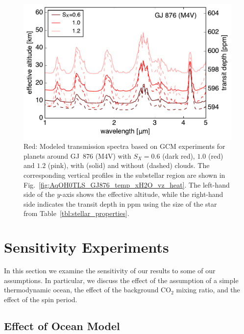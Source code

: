 \documentclass[11pt,numberedappendix,twocolappendix,]{emulateapj}
\newcommand{\yf}[1]{{\color{orange}#1}}
\begin{document}
\begin{figure}[!h]
    \begin{center}
    \includegraphics[width=\hsize]{fig/transit_GJ876.pdf}
    \end{center}
\caption{Red: Modeled transmission spectra based on GCM experiments for planets around GJ~876 (M4V) with $S_X=0.6$ (dark red), $1.0$ (red) and $1.2$ (pink), with (solid) and without (dashed) clouds. The corresponding vertical profiles in the substellar region are shown in Fig.~\ref{fig:AqOH0TLS_GJ876_temp_xH2O_vz_heat}. The left-hand side of the $y$-axis shows the effective altitude, while the right-hand side indicates the transit depth in ppm using the size of the star from Table~\ref{tbl:stellar_properties}.}
\label{fig:transmission}
\end{figure}


\section{Sensitivity \yf{Experiments} }
\label{s:sensitivity}

In this section we examine the sensitivity of our results to some of our assumptions. 
In particular, we discuss the effect of the assumption of a simple thermodynamic ocean, the effect of the background CO$_2$ mixing ratio, and the effect of the spin period. 


\subsection{Effect of Ocean Model}
\label{ss:sensitivity_ocean}
\end{document}
